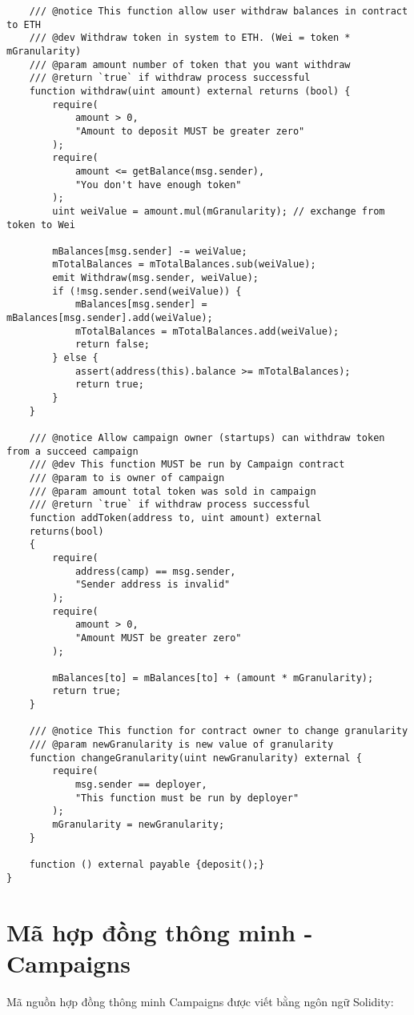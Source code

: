\documentclass[../main-report.tex]{subfiles}
\begin{document}
\begin{lstlisting}
    /// @notice This function allow user withdraw balances in contract to ETH
    /// @dev Withdraw token in system to ETH. (Wei = token * mGranularity)
    /// @param amount number of token that you want withdraw
    /// @return `true` if withdraw process successful
    function withdraw(uint amount) external returns (bool) {
        require(
            amount > 0,
            "Amount to deposit MUST be greater zero"
        );
        require(
            amount <= getBalance(msg.sender),
            "You don't have enough token"
        );
        uint weiValue = amount.mul(mGranularity); // exchange from token to Wei
        
        mBalances[msg.sender] -= weiValue;
        mTotalBalances = mTotalBalances.sub(weiValue);
        emit Withdraw(msg.sender, weiValue);
        if (!msg.sender.send(weiValue)) {
            mBalances[msg.sender] = mBalances[msg.sender].add(weiValue);
            mTotalBalances = mTotalBalances.add(weiValue);
            return false;
        } else {
            assert(address(this).balance >= mTotalBalances);
            return true;
        }
    }

    /// @notice Allow campaign owner (startups) can withdraw token from a succeed campaign
    /// @dev This function MUST be run by Campaign contract
    /// @param to is owner of campaign
    /// @param amount total token was sold in campaign
    /// @return `true` if withdraw process successful
    function addToken(address to, uint amount) external
    returns(bool)
    {
        require(
            address(camp) == msg.sender,
            "Sender address is invalid"
        );
        require(
            amount > 0,
            "Amount MUST be greater zero"
        );

        mBalances[to] = mBalances[to] + (amount * mGranularity);
        return true;
    }

    /// @notice This function for contract owner to change granularity
    /// @param newGranularity is new value of granularity
    function changeGranularity(uint newGranularity) external {
        require(
            msg.sender == deployer,
            "This function must be run by deployer"
        );
        mGranularity = newGranularity;
    }

    function () external payable {deposit();}
}
\end{lstlisting}

\chapter{Mã hợp đồng thông minh - Campaigns}
Mã nguồn hợp đồng thông minh Campaigns được viết bằng ngôn ngữ Solidity:
\end{document}
